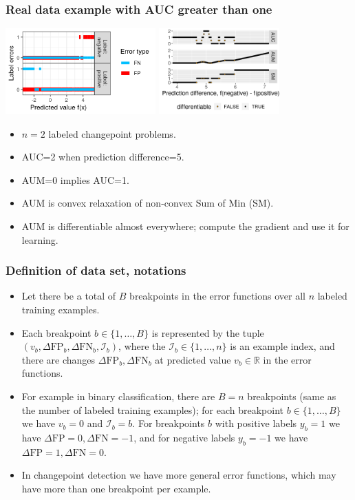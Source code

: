 \documentclass{beamer}
\begin{document}
\begin{frame}
  \frametitle{Real data example with AUC greater than one}
  
  \includegraphics[height=1.3in]{figure-aum-convexity-profiles}
  \includegraphics[height=1.3in]{figure-aum-convexity}

  \begin{itemize}
  \item $n=2$ labeled changepoint problems.
  \item AUC=2 when prediction difference=5.
  \item AUM=0 implies AUC=1.
  \item AUM is convex relaxation of non-convex Sum of Min (SM).
  \item AUM is differentiable almost everywhere; compute the gradient
    and use it for learning.
  \end{itemize}

\end{frame}

\begin{frame}
  \frametitle{Definition of data set, notations}

  \begin{itemize}
  \item Let there be a total of $B$ breakpoints in the error functions over
    all $n$ labeled training examples.
  \item Each breakpoint
  $b\in\{1,\dots, B\}$ is represented by the tuple
  $(v_b, \Delta\text{FP}_b, \Delta\text{FN}_b, \mathcal I_b)$, where the
  $\mathcal I_b\in\{1,\dots,n\}$ is an example index, and there are
  changes $\Delta\text{FP}_b, \Delta\text{FN}_b$ at predicted value
  $v_b\in\mathbb R$ in the error functions.
\item For example in binary
  classification, there are $B=n$ breakpoints (same as the number of
  labeled training examples); for each breakpoint $b\in\{1,\dots,B\}$
  we have $v_b=0$ and $\mathcal I_b=b$.  For breakpoints $b$ with
  positive labels $y_b=1$ we have
  $\Delta\text{FP}=0,\Delta\text{FN}=-1$, and for negative labels
  $y_b=-1$ we have $\Delta\text{FP}=1,\Delta\text{FN}=0$.  
\item   In
  changepoint detection we have more general error functions, which
  may have more than one breakpoint per example.
  \end{itemize}
  
\end{frame}
\end{document}
